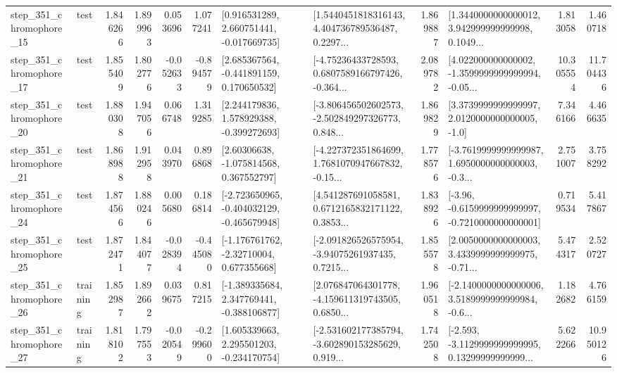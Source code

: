 \begin{tabular}{llrrrrllrlrr}
  step\_351\_chromophore\_15 &      test &      1.846266 &    1.899963 &      0.053696 &  1.077241 &    [0.916531289, 2.660751441, -0.017669735] &  [1.5440451818316143, 4.404736789536487, 0.2297... &       1.869887 &  [1.3440000000000012, 3.942999999999998, 0.1049... &            1.813058 &          1.460718 \\
  step\_351\_chromophore\_17 &      test &      1.855409 &    1.802776 &     -0.052633 & -0.894579 &    [2.685367564, -0.441891159, 0.170650532] &  [-4.75236433728593, 0.6807589166797426, -0.364... &       2.089782 &  [4.022000000000002, -1.3599999999999994, -0.05... &           10.305554 &         11.704436 \\
  step\_351\_chromophore\_20 &      test &      1.880308 &    1.947056 &      0.066748 &  1.319285 &    [2.244179836, 1.578929388, -0.399272693] &  [-3.806456502602573, -2.502849297326773, 0.848... &       1.869829 &     [3.3739999999999997, 2.0120000000000005, -1.0] &            7.346166 &          4.466635 \\
  step\_351\_chromophore\_21 &      test &      1.868988 &    1.912958 &      0.043970 &  0.896868 &     [2.60306638, -1.075814568, 0.367552797] &  [-4.227372351864699, 1.7681070947667832, -0.15... &       1.778576 &  [-3.7619999999999987, 1.6950000000000003, -0.3... &            2.751007 &          3.758292 \\
  step\_351\_chromophore\_24 &      test &      1.874566 &    1.880246 &      0.005680 &  0.186814 &  [-2.723650965, -0.404032129, -0.465679948] &  [4.541287691058581, 0.6712165832171122, 0.3853... &       1.838926 &  [-3.96, -0.6159999999999997, -0.7210000000000001] &            0.719534 &          5.417867 \\
  step\_351\_chromophore\_25 &      test &      1.872471 &    1.844077 &     -0.028394 & -0.445080 &    [-1.176761762, -2.32710004, 0.677355668] &  [-2.091826526575954, -3.94075261937435, 0.7215... &       1.855578 &  [2.0050000000000003, 3.4339999999999975, -0.71... &            5.474317 &          2.520727 \\
  step\_351\_chromophore\_26 &  training &      1.852987 &    1.892662 &      0.039675 &  0.817215 &   [-1.389335684, 2.347769441, -0.388106877] &  [2.076847064301778, -4.159611319743505, 0.6850... &       1.960518 &  [-2.1400000000000006, 3.5189999999999984, -0.6... &            1.182682 &          4.766159 \\
  step\_351\_chromophore\_27 &  training &      1.818102 &    1.797553 &     -0.020549 & -0.299600 &    [1.605339663, 2.295501203, -0.234170754] &  [-2.531602177385794, -3.602890153285629, 0.919... &       1.742508 &  [-2.593, -3.1129999999999995, 0.13299999999999... &            5.622266 &         10.950126 \\

\end{tabular}
